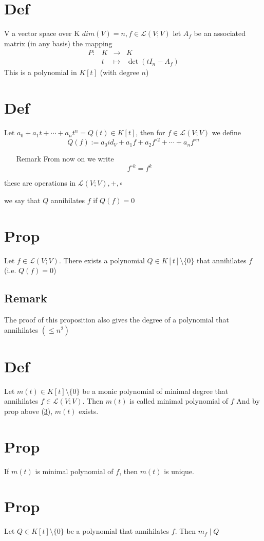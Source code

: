\documentclass{article}
\begin{document}
\section{Def}
V a vector space over K $dim(V)=n,f\in \mathscr{L}(V;V)$ let $A_f$ be an associated matrix (in any basis) the mapping
$$\begin{aligned}
    P: &K &\rightarrow& K\\&t&\mapsto& \det(tI_n-A_f)
\end{aligned}$$
This is a polynomial in $K[t]$ (with degree $n$)
\section{Def}
Let $a_0+a_1t+\cdots+a_nt^n= Q(t)\in K[t]$, then for $f\in \mathscr{L}(V;V)$ we define 
$$Q(f):=a_0id_V+a_1f+a_2f^{\circ 2}+\cdots+a_nf^{\circ n}$$
\begin{itemize}
    \item[Remark]
From now on we write
$$f^{\circ k}=f^k$$
\end{itemize}
these are operations in $\mathscr{L}(V;V),+,\circ$

we say that $Q$ annihilates $f$ if $Q(f)=0$
\section{Prop}
\label{Prop.48.17}
Let $f\in \mathscr{L}(V;V)$. There exists a polynomial $Q\in K[t]\setminus\{0\}$ that annihilates $f$ (i.e. $Q(f)=0$)
\subsection*{Remark}The proof of this proposition also gives the degree of a polynomial that annihilates $(\leq n^2)$
\section{Def}
Let $m(t)\in K[t]\setminus\{0\}$ be a monic polynomial of minimal degree that annihilates $f\in \mathscr{L}(V;V)$. Then $m(t)$ is called minimal polynomial of $f$
And by prop above (\ref{Prop.48.17}), $m(t)$ exists.
\section{Prop}
If $m(t)$ is minimal polynomial of $f$, then $m(t)$ is unique.
\section{Prop}
Let $Q\in K[t]\setminus\{0\}$ be a polynomial that annihilates $f$. Then $m_f\mid Q$ 
\end{document}
